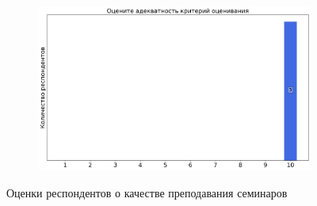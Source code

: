 \begin{figure}[H]
\begin{subfigure}[b]{0.45\textwidth}
			\end{subfigure}
			\begin{subfigure}[b]{0.45\textwidth}
				\centering
				\includegraphics[width=\textwidth]{images/2 course/Дифференциальные уравнения/seminarists-marks-Глухова Е.В.-3.png}
			\end{subfigure}	
			\caption{Оценки респондентов о качестве преподавания семинаров}
		\end{figure}

            
